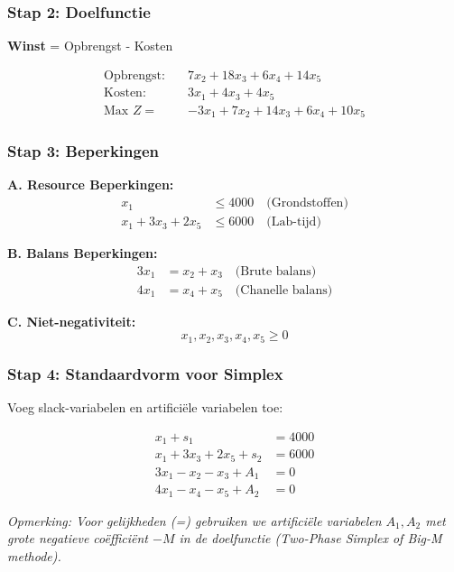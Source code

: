 \documentclass[a4paper,11pt]{article}
\begin{document}
\begin{oefenblok}[title=Lineair Programmeren — Rylon Parfums]
\subsubsection*{Stap 2: Doelfunctie}

\textbf{Winst} = Opbrengst - Kosten

\begin{align*}
\text{Opbrengst:} \quad & 7x_2 + 18x_3 + 6x_4 + 14x_5 \\
\text{Kosten:} \quad & 3x_1 + 4x_3 + 4x_5 \\
\hline
\text{Max } Z = & -3x_1 + 7x_2 + 14x_3 + 6x_4 + 10x_5
\end{align*}

\subsubsection*{Stap 3: Beperkingen}

\textbf{A. Resource Beperkingen:}
\begin{align}
x_1 &\leq 4000 \quad \text{(Grondstoffen)} \\
x_1 + 3x_3 + 2x_5 &\leq 6000 \quad \text{(Lab-tijd)}
\end{align}

\textbf{B. Balans Beperkingen:}
\begin{align}
3x_1 &= x_2 + x_3 \quad \text{(Brute balans)} \\
4x_1 &= x_4 + x_5 \quad \text{(Chanelle balans)}
\end{align}

\textbf{C. Niet-negativiteit:}
\[
x_1, x_2, x_3, x_4, x_5 \geq 0
\]

\subsubsection*{Stap 4: Standaardvorm voor Simplex}

Voeg slack-variabelen en artificiële variabelen toe:

\begin{align*}
x_1 + s_1 &= 4000 \\
x_1 + 3x_3 + 2x_5 + s_2 &= 6000 \\
3x_1 - x_2 - x_3 + A_1 &= 0 \\
4x_1 - x_4 - x_5 + A_2 &= 0
\end{align*}

\textit{Opmerking: Voor gelijkheden (=) gebruiken we artificiële variabelen $A_1, A_2$ met grote negatieve coëfficiënt $-M$ in de doelfunctie (Two-Phase Simplex of Big-M methode).}


\end{oefenblok}
\end{document}
